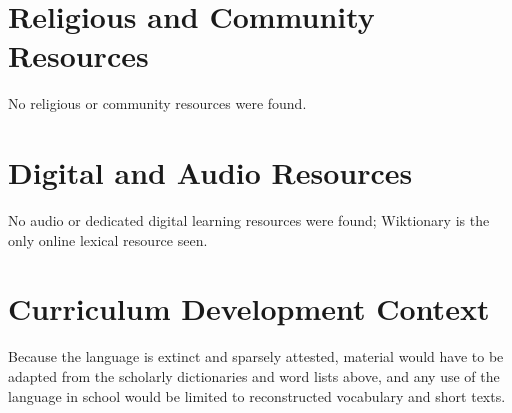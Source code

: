 \documentclass[12pt]{article}
\begin{document}
\section{Religious and Community Resources}
No religious or community resources were found.

\section{Digital and Audio Resources}
No audio or dedicated digital learning resources were found; Wiktionary is the only online lexical resource seen.

\section{Curriculum Development Context}
Because the language is extinct and sparsely attested, material would have to be adapted from the scholarly dictionaries and word lists above, and any use of the language in school would be limited to reconstructed vocabulary and short texts.
\end{document}
